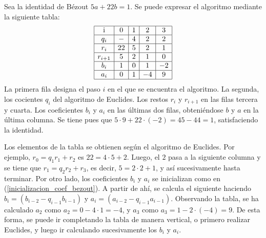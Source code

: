 \begin{TFGampliado}
    \begin{ej}
    Sea la identidad de Bézout $5a + 22b = 1$. Se puede expresar el algoritmo mediante la siguiente tabla:
    \renewcommand{\arraystretch}{1.3}
            \[
            \begin{array}{|c|c|c|c|c|}
                \hline
                \text{i} & 0 & 1 & 2 & 3 \\
                \hline
                q_i &  - & 4 & 2 & 2 \\
                \hline
                r_i & 22 & 5 & 2 & 1 \\
                \hline
                r_{i+1} & 5 & 2 & 1 & 0 \\
                \hline
                b_i & 1 & 0 & 1 & -2\\
                \hline
                a_i &0 & 1 & -4 & 9 \\
                \hline
            \end{array}
            \]
        La primera fila designa el paso $i$ en el que se encuentra el algoritmo. La segunda, los cocientes $q_i$ del algoritmo de Euclides. Los restos $r_i$ y $r_{i+1}$ en las filas tercera y cuarta. Los coeficientes $b_i$ y $a_i$ en las últimas dos filas, obteniéndose $b$ y $a$ en la última columna. Se tiene pues que $5\cdot 9 + 22\cdot (-2) = 45 - 44 = 1$, satisfaciendo la identidad.
        
        \item Los elementos de la tabla se obtienen según el algoritmo de Euclides. Por ejemplo, $r_0 = q_1r_1 + r_2$ es  $22 = 4\cdot 5 + 2$. Luego, el $2$ pasa a la siguiente columna y se tiene que $r_1 = q_2r_2 + r_3$, es decir,  $5 = 2\cdot 2 + 1$, y así sucesivamente hasta terminar. Por otro lado, los coeficientes $b_i$ y $a_i$ se inicializan como en (\ref{inicializacion_coef_bezout}). A partir de ahí, se calcula el siguiente haciendo $b_i = (b_{i-2} -q_{i-1}b_{i-1})$ y $a_i = (a_{i-2}-q_{i-1}a_{i-1})$. Observando la tabla, se ha calculado $a_2$ como $a_2 = 0 - 4\cdot 1 = -4$, y $a_3$ como $a_3 = 1 -2\cdot(-4) = 9$. De esta forma, se puede ir completando la tabla de manera vertical, o primero realizar Euclides, y luego ir calculando sucesivamente los $b_i$ y $a_i$.
    \end{ej}
\end{TFGampliado}

